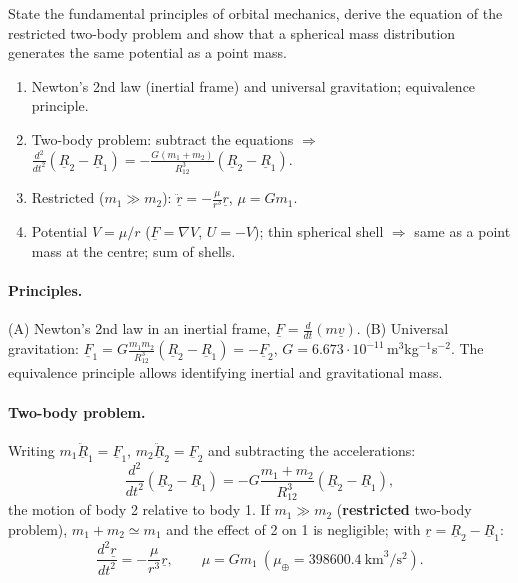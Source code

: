 \begin{qbox}
State the fundamental principles of orbital mechanics, derive the equation of the restricted two-body problem and show that a
spherical mass distribution generates the same potential as a point mass.
\end{qbox}
\begin{outline}
\begin{enumerate}
\item Newton's 2nd law (inertial frame) and universal gravitation; equivalence principle.
\item Two-body problem: subtract the equations $\Rightarrow$ $\frac{d^2}{dt^2}(\underline R_2-\underline R_1)=-\frac{G(m_1+m_2)}{R_{12}^3}(\underline R_2-\underline R_1)$.
\item Restricted ($m_1\gg m_2$): $\ddot{\underline r}=-\frac{\mu}{r^3}\underline r$, $\mu=Gm_1$.
\item Potential $V=\mu/r$ ($\underline F=\nabla V$, $U=-V$); thin spherical shell $\Rightarrow$ same as a point mass at the centre; sum of shells.
\end{enumerate}
\end{outline}
\answer
\paragraph{Principles.} (A) Newton's 2nd law in an inertial frame, $\underline F=\frac{d}{dt}(m\underline v)$. (B) Universal gravitation:
$\underline F_1=G\frac{m_1m_2}{R_{12}^3}(\underline R_2-\underline R_1)=-\underline F_2$, $G=6.673\cdot10^{-11}$\,m$^3$kg$^{-1}$s$^{-2}$. The equivalence
principle allows identifying inertial and gravitational mass.

\paragraph{Two-body problem.} Writing $m_1\ddot{\underline R}_1=\underline F_1$, $m_2\ddot{\underline R}_2=\underline F_2$ and subtracting the accelerations:
\begin{equation}
\frac{d^{2}}{dt^{2}}\left(\underline{R}_{2}-\underline{R}_{1}\right)=-G\frac{m_{1}+m_{2}}{R_{12}^{3}}\left(\underline{R}_{2}-\underline{R}_{1}\right),
\end{equation}
the motion of body 2 relative to body 1. If $m_1\gg m_2$ (\textbf{restricted} two-body problem), $m_1+m_2\simeq m_1$ and the effect of 2 on
1 is negligible; with $\underline r=\underline R_2-\underline R_1$:
\begin{equation}
\frac{d^{2}\underline r}{dt^{2}}=-\frac{\mu}{r^{3}}\underline r,\qquad \mu=Gm_1\ (\mu_\oplus=398600.4\ \text{km}^3/\text{s}^2).
\end{equation}


